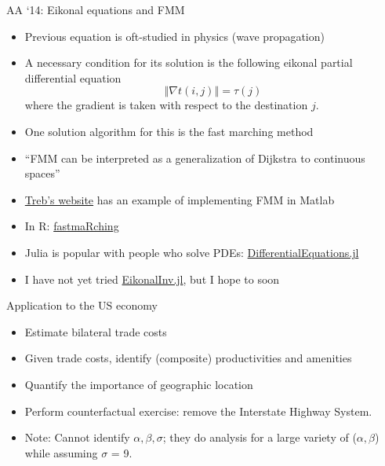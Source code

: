 \documentclass[11pt,notes=hide,aspectratio=169]{beamer}
\begin{document}
\begin{frame}{AA `14: Eikonal equations and FMM}
\begin{itemize}
	\item Previous equation is oft-studied in physics (wave propagation)
	\item A necessary condition for its solution is the following eikonal partial differential equation
	$$\left\Vert \nabla t(i,j) \right\Vert =\tau(j) $$
	where the gradient is taken with respect to the destination $j$.
	\item One solution algorithm for this is the fast marching method
	\item ``FMM can be interpreted as a generalization of Dijkstra to continuous spaces''
	\item \href{https://sites.google.com/site/treballen/research}{Treb's website} has an example of implementing FMM in Matlab
	\item In R: \href{https://cran.r-project.org/web/packages/fastmaRching/index.html}{fastmaRching}
	\item Julia is popular with people who solve PDEs: \href{https://github.com/SciML/DifferentialEquations.jl}{DifferentialEquations.jl}
	\item I have not yet tried \href{https://github.com/JuliaInv/EikonalInv.jl}{EikonalInv.jl}, but I hope to soon
\end{itemize}
\end{frame}
\begin{frame}{Application to the US economy}
\begin{itemize}
\item Estimate bilateral trade costs
\item Given trade costs, identify (composite) productivities and amenities 
\item Quantify the importance of geographic location
\item Perform counterfactual exercise: remove the Interstate Highway System.
\item Note: Cannot identify $\alpha, \beta, \sigma$; they do analysis for a large variety of ($\alpha, \beta$) while assuming $\sigma$ = 9.
\end{itemize}
\end{frame}
\end{document}

